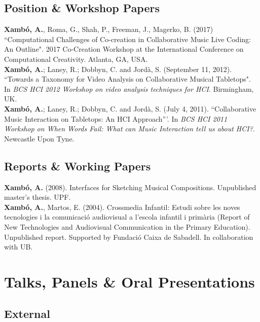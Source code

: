 \documentclass[10pt, a4paper]{article}
\newcommand{\years}[1]{\marginnote{\scriptsize #1}}
\begin{document}
\subsection*{Position \& Workshop Papers}
\noindent

\years{2017}\textbf{Xambó, A.}, Roma, G., Shah, P., Freeman, J., Magerko, B. (2017) “Computational Challenges of Co-creation in Collaborative Music Live Coding: An Outline". 2017 Co-Creation Workshop at the International Conference on Computational Creativity. Atlanta, GA, USA.\\ 
\years{2012}\textbf{Xambó, A.}; Laney, R.; Dobbyn, C. and Jordà, S. (September 11, 2012). “Towards a Taxonomy for Video Analysis on Collaborative Musical Tabletops". In \emph{BCS HCI 2012 Workshop on video analysis techniques for HCI}. Birmingham, UK.\\
\years{2011}\textbf{Xambó, A.}; Laney, R.; Dobbyn, C. and Jordà, S. (July 4, 2011). ``Collaborative Music Interaction on Tabletops: An HCI Approach'''. In \emph{BCS HCI 2011 Workshop on When Words Fail: What can Music Interaction tell us about HCI?}. Newcastle Upon Tyne.

\subsection*{Reports \& Working Papers}
\noindent

\years{2008}\textbf{Xambó, A.} (2008). Interfaces for Sketching Musical Compositions. Unpublished master's thesis. UPF.\\ 
\years{2004}\textbf{Xambó, A.}, Martos, E. (2004). Crossmedia Infantil: Estudi sobre les noves tecnologies i la comunicació audiovisual a l'escola infantil i primària (Report of New Technologies and Audiovisual Communication in the Primary Education). Unpublished report. Supported by Fundació Caixa de Sabadell. In collaboration with UB.

\section*{Talks, Panels \& Oral Presentations}
\noindent

\subsection*{External}
\noindent
\end{document}
